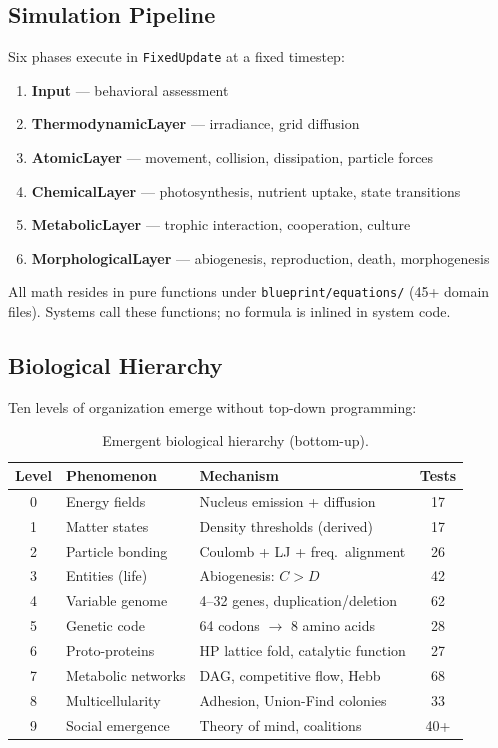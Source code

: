 \documentclass[11pt,a4paper]{article}
\begin{document}
\subsection{Simulation Pipeline}

Six phases execute in \texttt{FixedUpdate} at a fixed timestep:

\begin{enumerate}
  \item \textbf{Input} --- behavioral assessment
  \item \textbf{ThermodynamicLayer} --- irradiance, grid diffusion
  \item \textbf{AtomicLayer} --- movement, collision, dissipation,
        particle forces
  \item \textbf{ChemicalLayer} --- photosynthesis, nutrient uptake,
        state transitions
  \item \textbf{MetabolicLayer} --- trophic interaction, cooperation,
        culture
  \item \textbf{MorphologicalLayer} --- abiogenesis, reproduction,
        death, morphogenesis
\end{enumerate}

All math resides in pure functions under
\texttt{blueprint/equations/} (45+ domain files).
Systems call these functions; no formula is inlined in
system code.

\subsection{Biological Hierarchy}

Ten levels of organization emerge without top-down programming:

\begin{table}[h]
\centering
\caption{Emergent biological hierarchy (bottom-up).}
\label{tab:hierarchy}
\small
\begin{tabular}{@{}cllc@{}}
\toprule
\textbf{Level} & \textbf{Phenomenon} & \textbf{Mechanism} & \textbf{Tests} \\
\midrule
0 & Energy fields & Nucleus emission + diffusion & 17 \\
1 & Matter states & Density thresholds (derived) & 17 \\
2 & Particle bonding & Coulomb + LJ + freq.\ alignment & 26 \\
3 & Entities (life) & Abiogenesis: $C > D$ & 42 \\
4 & Variable genome & 4--32 genes, duplication/deletion & 62 \\
5 & Genetic code & 64 codons $\to$ 8 amino acids & 28 \\
6 & Proto-proteins & HP lattice fold, catalytic function & 27 \\
7 & Metabolic networks & DAG, competitive flow, Hebb & 68 \\
8 & Multicellularity & Adhesion, Union-Find colonies & 33 \\
9 & Social emergence & Theory of mind, coalitions & 40+ \\
\bottomrule
\end{tabular}
\end{table}
\end{document}
